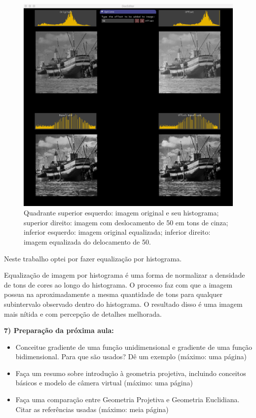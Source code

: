 \documentclass[a4paper]{sbgames}               %
\begin{document}
\begin{figure} [h!]
  \centering 
  \includegraphics[width=0.95\linewidth]{imgs/equalized}
 \caption{Quadrante superior esquerdo: imagem original e seu histograma; superior direito: imagem com deslocamento de 50 em tons de cinza; inferior esquerdo: imagem original equalizada; inferior direito: imagem equalizada do delocamento de 50. } 
 \label{fig:burstgoogle} 
\end{figure}

Neste trabalho optei por fazer equalização por histograma.

Equalização de imagem por histograma é uma forma de normalizar a densidade de tons de cores ao longo do histograma. O processo faz com que a imagem possua na aproximadamente a mesma quantidade de tons para qualquer subintervalo observado dentro do histograma. O resultado disso é uma imagem mais nítida e com percepção de detalhes melhorada.

\pagebreak
\textbf{7) Preparação da próxima aula:}
\begin{itemize}
\item Conceitue gradiente de uma função unidimensional e gradiente de uma função bidimensional. Para que são usados? Dê um exemplo (máximo: uma página)
\item Faça um resumo sobre introdução à geometria projetiva, incluindo conceitos básicos e modelo de câmera virtual (máximo: uma página)
\item Faça uma comparação entre Geometria Projetiva e Geometria Euclidiana. Citar as referências usadas (máximo: meia página)
\end{itemize}
\end{document}
